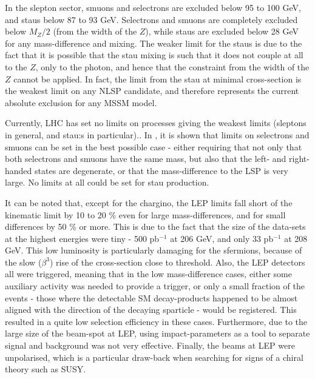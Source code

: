 In the slepton sector,
smuons and selectrons are excluded
below 95 to 100 GeV, and staus below 87 to 93 GeV. 
Selectrons and
smuons are completely excluded below $M_Z/2$ (from the width of the $Z$),
while staus are excluded below 28 GeV for any mass-difference and
mixing. 
The weaker limit for the staus is due to the fact that
it is possible that the stau mixing is such that it does not couple at
all to the $Z$, 
only to the photon, 
and hence that the constraint from the width of the $Z$ cannot be
applied.
In fact, the limit from the stau at minimal cross-section is the weakest limit on any
NLSP candidate, 
and therefore represents the current absolute exclusion for any MSSM model.

Currently,
LHC has set no limits on processes giving the weakest limits
(sleptons in general, and stau:s in particular)..
In \cite{Aaboud:2017leg,Aad:2014vma,Sirunyan:2018nwe},
it is shown that limits on selectrons and smuons can be set in the best possible case 
- either requiring that not only that both selectrons and smuons 
have the same mass, but also that the left- and right-handed states
are degenerate, or that the mass-difference to the LSP is very large.
No limits at all could be set for stau production.

It can be noted that, except for the chargino,
the LEP limits fall short of the kinematic limit
by 10 to 20 \% even for large mass-differences,
and for small differences by 50 \% or more.
This is due to the fact that the size of the data-sets at the
highest energies were tiny - 500 pb$^{-1}$ at 206 GeV, and
only 33  pb$^{-1}$ at 208 GeV.
This low luminosity is particularly damaging for the sfermions,
because of the slow ($\beta^3$) rise of the cross-section close to threshold.
Also,
the LEP detectors all were triggered,
meaning that in the low mass-difference cases,
either some auxiliary activity was needed to provide
a trigger, 
or only a small fraction of the events - 
those where the detectable SM decay-products happened to be
almost aligned with the direction of the decaying sparticle -
would be registered.
This resulted in a quite low selection efficiency in these cases.
Furthermore,
due to the large size of the beam-spot at LEP,
using impact-parameters as a tool to separate signal
and background was not very effective.
Finally,
the beams at LEP were unpolarised,
which is a particular draw-back when searching for signs
of a chiral theory such as SUSY.


